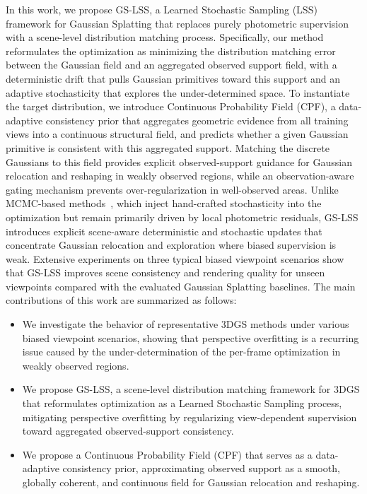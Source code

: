 \documentclass[lettersize,journal]{IEEEtran}
\begin{document}
In this work, we propose GS-LSS, a Learned Stochastic Sampling (LSS) framework for Gaussian Splatting that 
replaces purely photometric supervision with a scene-level distribution matching process. 
Specifically, our method reformulates the optimization as minimizing the distribution matching error between the Gaussian field and an aggregated observed support field, with a deterministic drift that pulls Gaussian primitives toward this support and an adaptive stochasticity that explores the under-determined space.
To instantiate the target distribution, we introduce Continuous Probability Field (CPF), a data-adaptive consistency prior that aggregates geometric evidence from all training views into a continuous structural field, and predicts whether a given Gaussian primitive is consistent with this aggregated support. 
Matching the discrete Gaussians to this field provides explicit observed-support guidance for Gaussian relocation and reshaping in weakly observed regions, while an observation-aware gating mechanism prevents over-regularization in well-observed areas.
Unlike MCMC-based methods~\cite{mcmc,mh3dgs}, which inject hand-crafted stochasticity into the optimization but remain primarily driven by local photometric residuals, GS-LSS introduces explicit scene-aware deterministic and stochastic updates that concentrate Gaussian relocation and exploration where biased supervision is weak.
Extensive experiments on three typical biased viewpoint scenarios show that GS-LSS improves scene consistency and rendering quality for unseen viewpoints compared with the evaluated Gaussian Splatting baselines.
The main contributions of this work are summarized as follows:
\begin{itemize}
    \item We investigate the behavior of representative 3DGS methods under various biased viewpoint scenarios, showing that perspective overfitting is a recurring issue caused by the under-determination of the per-frame optimization in weakly observed regions.
    \item We propose GS-LSS, a scene-level distribution matching framework for 3DGS that reformulates optimization as a Learned Stochastic Sampling process, mitigating perspective overfitting by regularizing view-dependent supervision toward aggregated observed-support consistency.
    \item We propose a Continuous Probability Field (CPF) that serves as a data-adaptive consistency prior, approximating observed support as a smooth, globally coherent, and continuous field for Gaussian relocation and reshaping.
\end{itemize}
\end{document}

